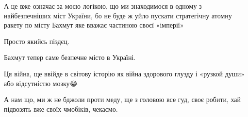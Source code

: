 А  це вже означає за моєю логікою, що  ми знаходимося в одному з
найбезпечніших міст України, бо не буде ж уйло пускати стратегічну атомну
ракету по місту Бахмут яке вважає частиною своєї «імперії»

Просто якийсь піздєц. 

Бахмут тепер саме безпечне місто в Україні.

Ця війна, ще ввійде в світову історію як війна здорового глузду і «рузкой
души» або відсутністю мозку😂 

А нам що, ми ж не бджоли проти меду, ще з головою все гуд, своє робити, хай
підвозять  вже своїх чмобіків, чекаємо.
